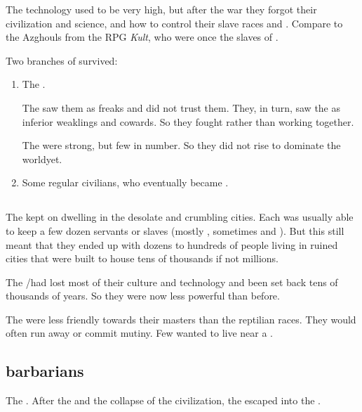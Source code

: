 The technology used to be very high, but after the war they forgot their civilization and science, and how to control their slave races and \daemons. 
Compare to the Azghouls from the RPG \emph{Kult}, who were once the slaves of \humans. 

Two branches of \ophidians{} survived: 

\begin{enumerate}
  \item 
    The \dragons.
    
    The \quiljaaran{} saw them as freaks and did not trust them. 
    They, in turn, saw the \quiljaaran{} as inferior weaklings and cowards. 
    So they fought rather than working together. 
    
    The \dragons{} were strong, but few in number. 
    So they did not rise to dominate the world\prikker yet. 
  \item 
    Some regular \ophidian{} civilians, who eventually became \quiljaaran. 
\end{enumerate}









\subsection{\QuilJaaran}
The \quiljaaran{} kept on dwelling in the desolate and crumbling \ophidian{} cities. 
Each \quiljaar{} was usually able to keep a few dozen servants or slaves (mostly \loculs, sometimes \cregorrs{} and \nephilim). 
But this still meant that they ended up with dozens to hundreds of people living in  ruined cities that were built to house tens of thousands if not millions. 

The \ophidians/\quiljaaran had lost most of their culture and technology and been set back tens of thousands of years.
So they were now less powerful than before. 

The \nephilim{} were less friendly towards their \quiljaaran{} masters than the reptilian races. 
They would often run away or commit mutiny. 
Few \nephilim{} wanted to live near a \quiljaar. 









\subsection{\Cregorr{} barbarians}
The \cregorrs{} . 
After the \firstbanewar{} and the collapse of the \ophidian{} civilization, the \cregorrs{} escaped into the \wylde. 

